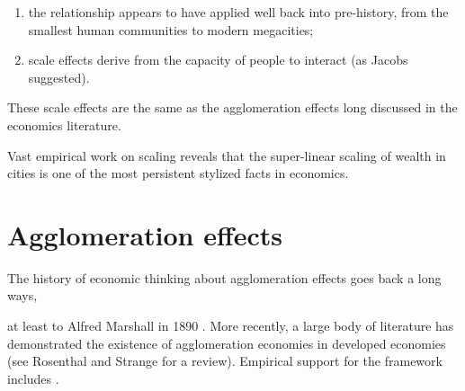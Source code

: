 {\begin{enumerate}
 \hspace{-1cm}In addition, 
\item the relationship appears to have applied well back into pre-history, from the smallest human communities to modern megacities; %
\item scale effects derive from the capacity of people to interact (as Jacobs suggested).
\end{enumerate}
These scale effects are the same as the agglomeration effects long discussed in the economics literature. {\color{red} Vast empirical work on scaling reveals that the super-linear scaling of wealth in cities is one of the most persistent stylized facts in economics. 






\section{Agglomeration effects}








The history of economic thinking about agglomeration effects goes back a long ways,} at least to  Alfred Marshall in 1890 \cite{giddingsPRINCIPLESECONOMICSAlfred1890}. %
More recently, a large body of literature has demonstrated the existence of agglomeration economies in developed economies (see Rosenthal and Strange \cite{rosenthalEvidenceNatureSources2004} for a review). Empirical support for the framework includes \cite{spenceUrbanizationGrowth2009, durantonAreCitiesEngines2009, durantonHumanCapitalExternalities2007}. 

}
